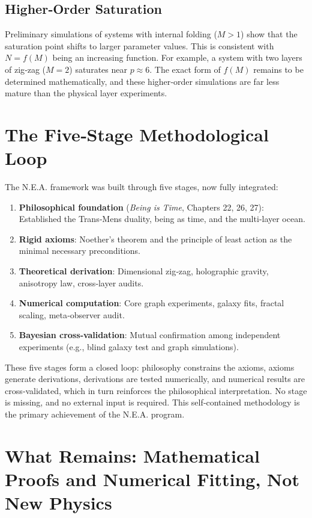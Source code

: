 \documentclass[12pt,a4paper]{article}
\begin{document}
\subsection{Higher‑Order Saturation}

Preliminary simulations of systems with internal folding (\(M>1\)) show that the saturation point shifts to larger parameter values. This is consistent with \(N = f(M)\) being an increasing function. For example, a system with two layers of zig‑zag (\(M=2\)) saturates near \(p \approx 6\). The exact form of \(f(M)\) remains to be determined mathematically, and these higher‑order simulations are far less mature than the physical layer experiments.

\section{The Five‑Stage Methodological Loop}

The N.E.A. framework was built through five stages, now fully integrated:

\begin{enumerate}
    \item \textbf{Philosophical foundation} (\textit{Being is Time}, Chapters 22, 26, 27): Established the Trans‑Mens duality, being as time, and the multi‑layer ocean.
    \item \textbf{Rigid axioms}: Noether’s theorem and the principle of least action as the minimal necessary preconditions.
    \item \textbf{Theoretical derivation}: Dimensional zig‑zag, holographic gravity, anisotropy law, cross‑layer audits.
    \item \textbf{Numerical computation}: Core graph experiments, galaxy fits, fractal scaling, meta‑observer audit.
    \item \textbf{Bayesian cross‑validation}: Mutual confirmation among independent experiments (e.g., blind galaxy test and graph simulations).
\end{enumerate}

These five stages form a closed loop: philosophy constrains the axioms, axioms generate derivations, derivations are tested numerically, and numerical results are cross‑validated, which in turn reinforces the philosophical interpretation. No stage is missing, and no external input is required. This self‑contained methodology is the primary achievement of the N.E.A. program.

\section{What Remains: Mathematical Proofs and Numerical Fitting, Not New Physics}
\end{document}
